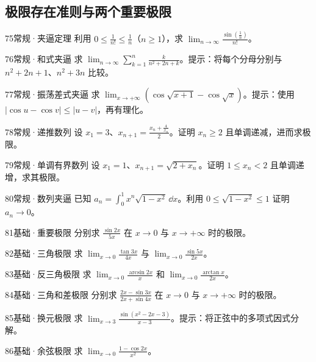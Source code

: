 \subsection{极限存在准则与两个重要极限}
\begin{exercise}{75}{常规·夹逼定理}
利用 $0\le\frac{1}{n!}\le\frac{1}{n}$（$n\ge1$），求 $\lim_{n\to\infty}\frac{\sin(\frac{1}{n})}{n!}$。
\end{exercise}
\begin{exercise}{76}{常规·和式夹逼}
求 $\lim_{n\to\infty}\sum_{k=1}^n\frac{k}{n^2+2n+k}$。提示：将每个分母分别与 $n^2+2n+1$、$n^2+3n$ 比较。
\end{exercise}
\begin{exercise}{77}{常规·振荡差式夹逼}
求 $\lim_{x\to+\infty}(\cos\sqrt{x+1}-\cos\sqrt x)$。提示：使用 $|\cos u-\cos v|\le|u-v|$，再有理化。
\end{exercise}
\begin{exercise}{78}{常规·递推数列}
设 $x_1=3$、$x_{n+1}=\frac{x_n+\frac{4}{x_n}}{2}$。证明 $x_n\ge2$ 且单调递减，进而求极限。
\end{exercise}
\begin{exercise}{79}{常规·单调有界数列}
设 $x_1=1$、$x_{n+1}=\sqrt{2+x_n}$。证明 $1\le x_n<2$ 且单调递增，求其极限。
\end{exercise}
\begin{exercise}{80}{常规·数列夹逼}
已知 $a_n=\int_0^1x^n\sqrt{1-x^2}\,\dd x$。利用 $0\le\sqrt{1-x^2}\le1$ 证明 $a_n\to0$。
\end{exercise}
\begin{exercise}{81}{基础·重要极限}
分别求 $\frac{\sin2x}{5x}$ 在 $x\to0$ 与 $x\to+\infty$ 时的极限。
\end{exercise}
\begin{exercise}{82}{基础·三角极限}
求 $\lim_{x\to0}\frac{\tan3x}{4x}$ 与 $\lim_{x\to0}\frac{\sin5x}{2x}$。
\end{exercise}
\begin{exercise}{83}{基础·反三角极限}
求 $\lim_{x\to0}\frac{\arcsin2x}{x}$ 和 $\lim_{x\to0}\frac{\arctan x}{2x}$。
\end{exercise}
\begin{exercise}{84}{基础·三角和差极限}
分别求 $\frac{2x-\sin3x}{2x+\sin4x}$ 在 $x\to0$ 与 $x\to+\infty$ 时的极限。
\end{exercise}
\begin{exercise}{85}{基础·换元极限}
求 $\lim_{x\to3}\frac{\sin(x^2-2x-3)}{x-3}$。提示：将正弦中的多项式因式分解。
\end{exercise}
\begin{exercise}{86}{基础·余弦极限}
求 $\lim_{x\to0}\frac{1-\cos2x}{x^2}$。
\end{exercise}
